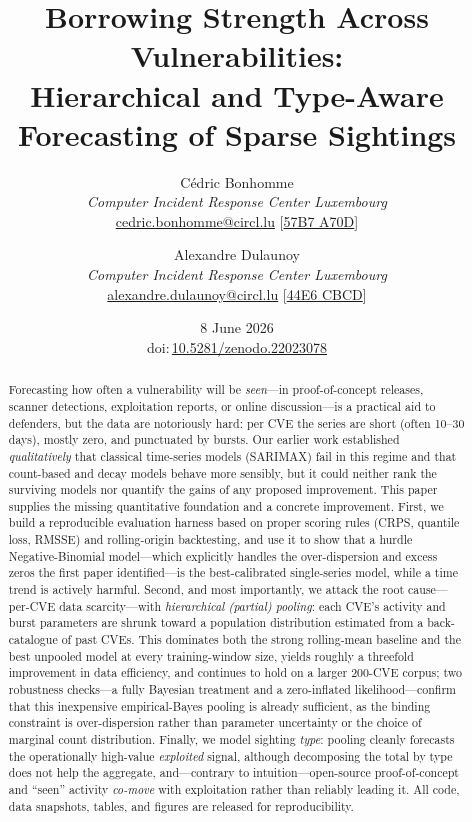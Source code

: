 \documentclass[]{article}
\title{\textbf{Borrowing Strength Across Vulnerabilities:\\ Hierarchical and Type-Aware Forecasting of Sparse Sightings}}
\author{
    Cédric Bonhomme \\
    \textit{Computer Incident Response Center Luxembourg} \\
    \href{mailto:cedric.bonhomme@circl.lu}{cedric.bonhomme@circl.lu} [\href{https://openpgp.circl.lu/pks/lookup?op=get\&search=0xA1CB94DE57B7A70D}{57B7 A70D}]
    \and
    Alexandre Dulaunoy \\
    \textit{Computer Incident Response Center Luxembourg} \\
    \href{mailto:alexandre.dulaunoy@circl.lu}{alexandre.dulaunoy@circl.lu} [\href{https://pgp.circl.lu/pks/lookup?op=get\&search=0x3b12dcc282fa29312f5b709a09e2cd4944e6cbcd}{44E6 CBCD}]
}
\date{8 June 2026\\[0.6em]
  \small doi:\,\href{https://doi.org/10.5281/zenodo.22023078}%
  {10.5281/zenodo.22023078}}
\begin{document}
\maketitle

\begin{abstract}
Forecasting how often a vulnerability will be \emph{seen}---in proof-of-concept
releases, scanner detections, exploitation reports, or online discussion---is a
practical aid to defenders, but the data are notoriously hard: per CVE the series
are short (often 10--30 days), mostly zero, and punctuated by bursts. Our earlier
work \cite{bonhomme2026modeling} established \emph{qualitatively} that classical
time-series models (SARIMAX) fail in this regime and that count-based and decay
models behave more sensibly, but it could neither rank the surviving models nor
quantify the gains of any proposed improvement. This paper supplies the missing
quantitative foundation and a concrete improvement. First, we build a
reproducible evaluation harness based on proper scoring rules (CRPS, quantile
loss, RMSSE) and rolling-origin backtesting, and use it to show that a hurdle
Negative-Binomial model---which explicitly handles the over-dispersion and excess
zeros the first paper identified---is the best-calibrated single-series model,
while a time trend is actively harmful. Second, and most importantly, we attack
the root cause---per-CVE data scarcity---with \emph{hierarchical (partial)
pooling}: each CVE's activity and burst parameters are shrunk toward a population
distribution estimated from a back-catalogue of past CVEs. This dominates both
the strong rolling-mean baseline and the best unpooled model at every
training-window size, yields roughly a threefold improvement in data
efficiency, and continues to hold on a larger 200-CVE corpus; two robustness
checks---a fully Bayesian treatment and a zero-inflated
likelihood---confirm that this inexpensive empirical-Bayes pooling is already
sufficient, as the binding constraint is over-dispersion rather than parameter
uncertainty or the choice of marginal count distribution. Finally, we model
sighting \emph{type}: pooling cleanly forecasts the
operationally high-value \emph{exploited} signal, although decomposing the total
by type does not help the aggregate, and---contrary to intuition---open-source
proof-of-concept and ``seen'' activity \emph{co-move} with exploitation rather
than reliably leading it. All code, data snapshots, tables, and figures are
released for reproducibility.
\end{abstract}
\end{document}
